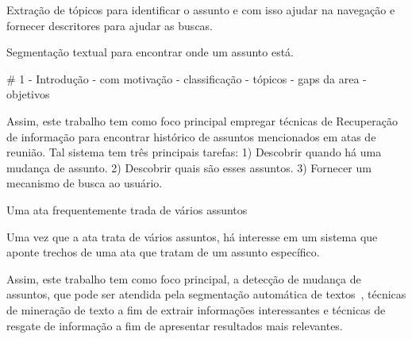 Extração de tópicos para identificar o assunto e com isso ajudar na navegação e fornecer descritores para ajudar as buscas.

Segmentação textual para encontrar onde um assunto está.
















		# 1 - Introdução 
			- com motivação
				- classificação
				- tópicos
			- gaps da area
			- objetivos



Assim, este trabalho tem como foco principal empregar técnicas de Recuperação de informação para encontrar histórico de assuntos mencionados em atas de reunião. Tal sistema tem três principais tarefas: 
1) Descobrir quando há uma mudança de assunto. 
2) Descobrir quais são esses assuntos. 
3) Fornecer um mecanismo de busca ao usuário. 



Uma ata frequentemente trada de vários assuntos

Uma vez que a ata trata de vários assuntos, 
há interesse em um sistema que aponte trechos de uma ata que tratam de um assunto específico. 

Assim, este trabalho tem como foco principal, a detecção de mudança de assuntos, que pode ser atendida pela segmentação automática de textos~\cite{Chen2017,Naili2016,Cardoso2017}, técnicas de mineração de texto a fim de extrair informações interessantes e técnicas de resgate de informação a fim de apresentar resultados mais relevantes. 



